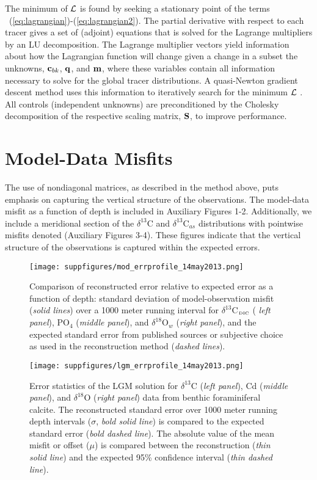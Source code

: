 \documentclass[agums]{aguplus}  %
\begin{document}
The minimum of ${\cal L}$ is found by seeking a stationary point of
the terms ~(\ref{eq:lagrangian})-(\ref{eq:lagrangian2}). The partial
derivative with respect to each tracer gives a set of (adjoint)
equations that is solved for the Lagrange multipliers by an LU
decomposition.  The Lagrange multiplier vectors yield information
about how the Lagrangian function will change given a change in a
subset the unknowns, ${\bf c}_{bk}$, ${\bf q}$, and ${\bf m}$, where
these variables contain all information necessary to solve for the
global tracer distributions.  A quasi-Newton gradient descent method
uses this information to iteratively search for the minimum ${\cal L}$
\citep{Nocedal-1980:Updating,Gilbert-Lemarechal-1989:some}. 
All controls (independent unknowns) are preconditioned by the Cholesky
decomposition of the respective scaling matrix, ${\bf S}$, to improve
performance.

\section{Model-Data Misfits}

The use of nondiagonal matrices, as described in the method above, puts emphasis on capturing the vertical structure of the observations. The model-data misfit as a function of depth is included in Auxiliary Figures 1-2. Additionally, we include a meridional section of the $\delta^{13}$C and $\delta^{13}$C$_{as}$ distributions with pointwise misfits denoted  (Auxiliary Figures 3-4). These figures indicate that the vertical structure of the observations is captured within the expected errors.   

\begin{figure}
\texttt{[image: suppfigures/mod\_errprofile\_14may2013.png]}
      \caption{Comparison of reconstructed error relative to expected
        error as a function of depth: standard deviation of
        model-observation misfit ({\it solid lines}) over a 1000 meter
        running interval for $\delta^{13}$C$_{\mbox{\tiny{DIC}}}$ ({\it
          left panel}), PO$_4$ ({\it middle panel}), and
        $\delta^{18}$O$_w$ ({\it right panel}), and the expected standard
        error from published sources or subjective choice as used in
        the reconstruction method ({\it dashed lines}).}
\end{figure}

\begin{figure}
\texttt{[image: suppfigures/lgm\_errprofile\_14may2013.png]}
\caption{Error statistics of the LGM solution for $\delta^{13}$C ({\it left panel}), Cd ({\it middle panel}), and $\delta^{18}$O ({\it right panel}) data from benthic foraminiferal calcite. The reconstructed standard error over 1000 meter running depth intervals ($\sigma$, {\it bold solid line}) is compared to the expected standard error ({\it bold dashed line}). The absolute value of the mean misfit or offset ($\mu$) is compared between the reconstruction ({\it thin solid line}) and the expected 95\% confidence interval ({\it thin dashed line}).}
\end{figure}
\end{document}
